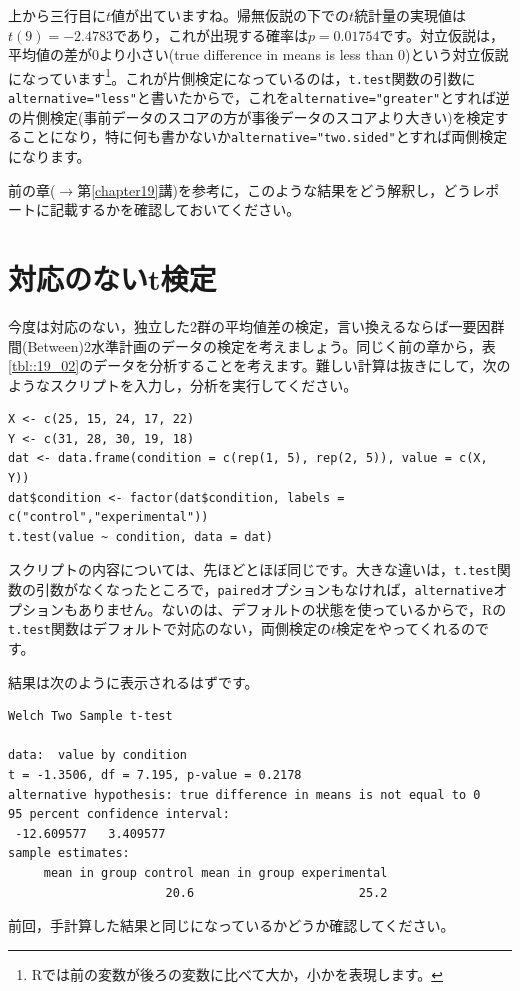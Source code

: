 \documentclass{ltjsbook}
\begin{document}
上から三行目に$t$値が出ていますね。帰無仮説の下での$t$統計量の実現値は$t(9)=-2.4783$であり，これが出現する確率は$p=0.01754$です。対立仮説は，平均値の差が0より小さい(true difference in means is less than 0)という対立仮説になっています\footnote{Rでは前の変数が後ろの変数に比べて大か，小かを表現します。}。これが片側検定になっているのは，\texttt{t.test}関数の引数に\texttt{alternative="less"}と書いたからで，これを\texttt{alternative="greater"}とすれば逆の片側検定(事前データのスコアの方が事後データのスコアより大きい)を検定することになり，特に何も書かないか\texttt{alternative="two.sided"}とすれば両側検定になります。

前の章($\to$第\ref{chapter19}講)を参考に，このような結果をどう解釈し，どうレポートに記載するかを確認しておいてください。

\section{対応のないt検定}
今度は対応のない，独立した2群の平均値差の検定，言い換えるならば一要因群間(Between)2水準計画のデータの検定を考えましょう。同じく前の章から，表\ref{tbl::19_02}のデータを分析することを考えます。難しい計算は抜きにして，次のようなスクリプトを入力し，分析を実行してください。
\begin{lstlisting}
X <- c(25, 15, 24, 17, 22)
Y <- c(31, 28, 30, 19, 18)
dat <- data.frame(condition = c(rep(1, 5), rep(2, 5)), value = c(X, Y))
dat$condition <- factor(dat$condition, labels =  c("control","experimental"))
t.test(value ~ condition, data = dat)
\end{lstlisting}
スクリプトの内容については、先ほどとほぼ同じです。大きな違いは，\texttt{t.test}関数の引数がなくなったところで，\texttt{paired}オプションもなければ，\texttt{alternative}オプションもありません。ないのは、デフォルトの状態を使っているからで，Rの\texttt{t.test}関数はデフォルトで対応のない，両側検定の$t$検定をやってくれるのです。

結果は次のように表示されるはずです。
\begin{tcolorbox}
\begin{verbatim}
Welch Two Sample t-test

data:  value by condition
t = -1.3506, df = 7.195, p-value = 0.2178
alternative hypothesis: true difference in means is not equal to 0
95 percent confidence interval:
 -12.609577   3.409577
sample estimates:
     mean in group control mean in group experimental 
                      20.6                       25.2 
\end{verbatim}
\end{tcolorbox}
前回，手計算した結果と同じになっているかどうか確認してください。
\end{document}
